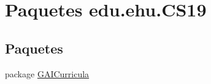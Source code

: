 \hypertarget{namespaceedu_1_1ehu_1_1_c_s19}{}\section{Paquetes edu.\+ehu.\+C\+S19}
\label{namespaceedu_1_1ehu_1_1_c_s19}
\subsection*{Paquetes}
\begin{DoxyCompactItemize}
\item 
package \mbox{\hyperlink{namespaceedu_1_1ehu_1_1_c_s19_1_1_g_a_i_curricula}{G\+A\+I\+Curricula}}
\end{DoxyCompactItemize}
